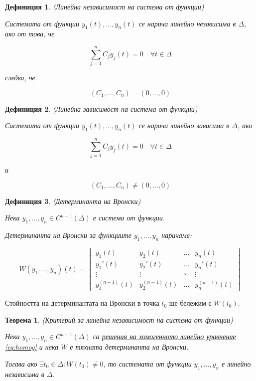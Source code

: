 \documentclass{scrartcl}
\newtheorem{theorem}{Теорема}
\newtheorem{definition}{Дефиниция}
\begin{document}
\begin{FlushLeft}
\begin{definition}
(Линейна независимост на система от функции)

Системата от функции $y_1(t), \dots, y_n(t)$ се нарича линейно независима в $\Delta$, ако от това, че

$$\sum_{j=1}^n C_jy_j(t) = 0 \quad \forall t \in \Delta$$

следва, че

$$(C_1, \dots, C_n) = (0, \dots, 0)$$
\end{definition}

\begin{definition}
(Линейна зависимост на система от функции)

Системата от функции $y_1(t), \dots, y_n(t)$ се нарича линейно зависима в $\Delta$, ако

$$\sum_{j=1}^n C_jy_j(t) = 0 \quad \forall t \in \Delta$$

и

$$(C_1, \dots, C_n) \ne (0, \dots, 0)$$
\end{definition}

\begin{definition}
(Детерминанта на Вронски)

Нека $y_1, \dots, y_n \in C^{n-1}(\Delta)$ е система от функции.

Детерминанта на Вронски за функциите $y_1, \dots, y_n$ наричаме:

$$
W(y_1, \dots, y_n)(t) = 
\begin{vmatrix}
y_1(t) & y_2(t) & \dots & y_n(t) \\
y_1'(t) & y_2'(t) & \dots & y_n'(t) \\
\vdots & \vdots & \ddots & \vdots \\
y_1^{(n-1)}(t) & y_2^{(n-1)}(t) & \dots & y_n^{(n-1)}(t)
\end{vmatrix}
$$
\end{definition}

Стойността на детерминантата на Вронски в точка $t_0$ ще бележим с $W(t_0)$.

\begin{theorem}
(Критерий за линейна независимост на система от функции)

Нека $y_1, \dots, y_n \in C^{n-1}(\Delta)$ са \underline{решения на хомогенното линейно уравнение \eqref{eq:homog}} и нека $W$ е тяхната детерминанта на Вронски.

Тогава ако $\exists t_0 \in \Delta : W(t_0) \ne 0$, то системата от функции $y_1, \dots, y_n$ е линейно независима в $\Delta$.
\end{theorem}


\end{FlushLeft}
\end{document}
